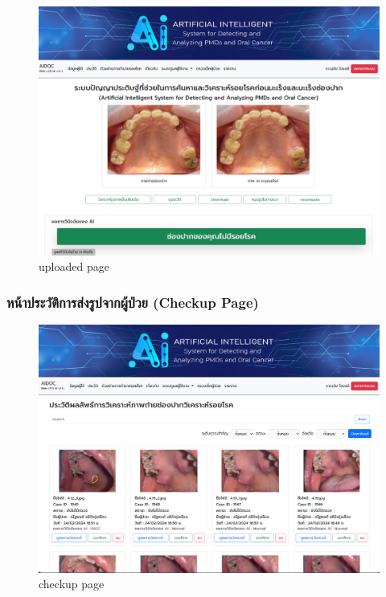 \begin{figure}[H]
  \centering
  \includegraphics[scale=0.3]{images/upload_complete_user.png}
  \caption{uploaded page}
  \label{fig:upload_complete_user}
\end{figure}

\subsubsection{หน้าประวัติการส่งรูปจากผู้ป่วย (Checkup Page)}

\begin{figure}[H]
  \centering
  \graphicspath{{./images/}}
  \includegraphics[scale=0.3]{checkup_user.png}
  \caption{checkup page}
  \label{fig:checkup_user}
\end{figure}
